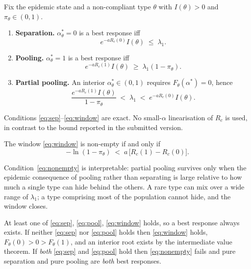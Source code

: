 \documentclass[sigconf,review]{acmart}
\begin{document}
\begin{theorem}
\label{thm:characterisation}
Fix the epidemic state and a non-compliant type $\theta$ with $I(\theta)>0$ and
$\pi_\theta\in(0,1)$.
\begin{enumerate}
\item \textbf{Separation.} $\alpha^{*}_\theta=0$ is a best response iff
  \begin{equation}e^{-aR_c(0)}I(\theta)\;\le\;\lambda_1.\label{eq:sep}\end{equation}
\item \textbf{Pooling.} $\alpha^{*}_\theta=1$ is a best response iff
  \begin{equation}e^{-aR_c(1)}I(\theta)\;\ge\;\lambda_1(1-\pi_\theta).\label{eq:pool}\end{equation}
\item \textbf{Partial pooling.} An interior $\alpha^{*}_\theta\in(0,1)$ requires
  $F_\theta(\alpha^{*})=0$, hence
  \begin{equation}
  \frac{e^{-aR_c(1)}I(\theta)}{1-\pi_\theta}\;<\;\lambda_1\;<\;e^{-aR_c(0)}I(\theta).
  \label{eq:window}\end{equation}
\end{enumerate}
\end{theorem}

Conditions \eqref{eq:sep}--\eqref{eq:window} are exact. No small-$\alpha$ linearisation of
$R_c$ is used, in contrast to the bound reported in the submitted version.

\begin{corollary}
\label{cor:nonempty}
The window \eqref{eq:window} is non-empty if and only if
\begin{equation}
-\ln(1-\pi_\theta)\;<\;a\,\bigl[R_c(1)-R_c(0)\bigr].
\label{eq:nonempty}
\end{equation}
\end{corollary}

Condition~\eqref{eq:nonempty} is interpretable: partial pooling survives only when the
epidemic consequence of pooling rather than separating is large relative to how much a
single type can hide behind the others. A rare type can mix over a wide range of
$\lambda_1$; a type comprising most of the population cannot hide, and the window closes.

\begin{corollary}
\label{cor:exhaust}
At least one of \eqref{eq:sep}, \eqref{eq:pool}, \eqref{eq:window} holds, so a best
response always exists. If neither \eqref{eq:sep} nor \eqref{eq:pool} holds then
\eqref{eq:window} holds, $F_\theta(0)>0>F_\theta(1)$, and an interior root exists by the
intermediate value theorem. If \emph{both} \eqref{eq:sep} and \eqref{eq:pool} hold then
\eqref{eq:nonempty} fails and pure separation and pure pooling are \emph{both} best
responses.
\end{corollary}
\end{document}
